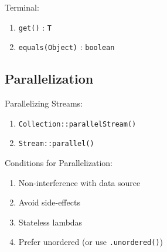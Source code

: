 \documentclass[12pt, a4paper]{article}
\begin{document}
\begin{multicols*}{2}
Terminal:
\begin{enumerate}[\roman*.]
  \item \lstinline|get()| : \lstinline|T|
  \item \lstinline|equals(Object)| : \lstinline|boolean|
\end{enumerate}
\colbreak

\subsection{Parallelization}
Parallelizing Streams:
\begin{enumerate}[\roman*.]
  \item \lstinline|Collection::parallelStream()|
  \item \lstinline|Stream::parallel()|
\end{enumerate}

Conditions for Parallelization:
\begin{enumerate}[\roman*.]
  \item Non-interference with data source
  \item Avoid side-effects
  \item Stateless lambdas
  \item Prefer unordered (or use \lstinline|.unordered()|)
\end{enumerate}

\end{multicols*}
\end{document}
